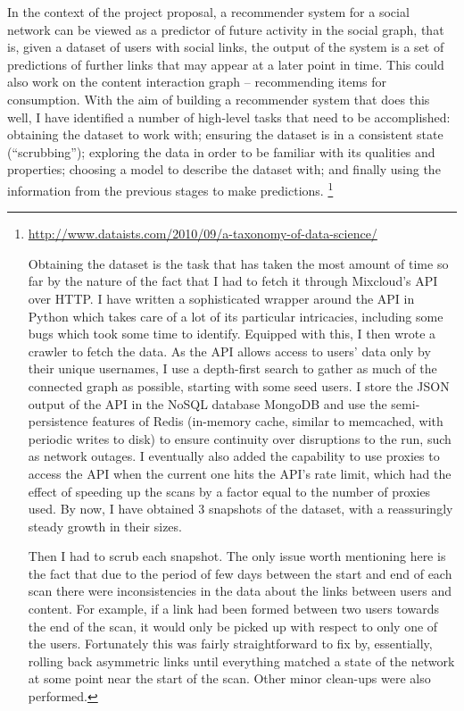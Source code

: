\documentclass[a4paper,11pt,titlepage]{article}
\begin{document}
In the context of the project proposal, a recommender system for a social 
network can be viewed as a predictor of future activity in the social graph, 
that is, given a dataset of users with social links, the output of the system is
 a set of predictions of further links that may appear at a later point in time. 
This could also work on the content interaction graph -- recommending items for 
consumption. With the aim of building a recommender system that does this well, 
I have identified a number of high-level tasks that need to be accomplished: 
obtaining the dataset to work with; ensuring the dataset is in a consistent 
state (``scrubbing''); exploring the data in order to be familiar with its 
qualities and properties; choosing a model to describe the dataset with; and 
finally using the information from the previous stages to make predictions.
\footnote{\url{http://www.dataists.com/2010/09/a-taxonomy-of-data-science/}

Obtaining the dataset is the task that has taken the most amount of time so far 
by the nature of the fact that I had to fetch it through Mixcloud's API over 
HTTP\@. I have written a sophisticated wrapper around the API in Python which 
takes care of a lot of its particular intricacies, including some bugs which 
took some time to identify. Equipped with this, I then wrote a crawler to fetch 
the data. As the API allows access to users' data only by their unique 
usernames, I use a depth-first search to gather as much of the connected graph 
as possible, starting with some seed users. I store the JSON output of the API 
in the NoSQL database MongoDB and use the semi-persistence features of Redis 
(in-memory cache, similar to memcached, with periodic writes to disk) to ensure 
continuity over disruptions to the run, such as network outages. I eventually 
also added the capability to use proxies to access the API when the current one 
hits the API's rate limit, which had the effect of speeding up the scans by a 
factor equal to the number of proxies used. By now, I have obtained 3 snapshots 
of the dataset, with a reassuringly steady growth in their sizes.

Then I had to scrub each snapshot. The only issue worth mentioning here is the 
fact that due to the period of few days between the start and end of each scan 
there were inconsistencies in the data about the links between users and 
content. For example, if a link had been formed between two users towards the 
end of the scan, it would only be picked up with respect to only one of the 
users. Fortunately this was fairly straightforward to fix by, essentially, 
rolling back asymmetric links until everything matched a state of the network 
at some point near the start of the scan. Other minor clean-ups were also 
performed.

}
\end{document}
